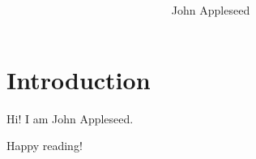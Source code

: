 \documentclass[twoside]{article}
\author{John Appleseed}
\date{\vspace{-2em}}
\title {\scshape \TheTitle~\TheYear\\[1ex] \large \underline{\TheSubtitle}}
\theoremstyle{definition}
\begin{document}
\maketitle
{}

\pagestyle{fancy}


\section*{Introduction}
Hi! I am John Appleseed. 

\lipsum[3]

Happy reading!


\tableofcontents

\newpage

\end{document}
